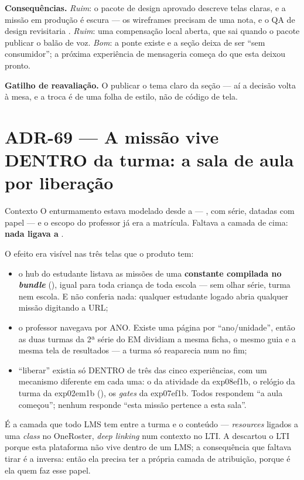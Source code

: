 \textbf{Consequências.} \emph{Ruim}: o pacote de design aprovado descreve telas
claras, e a missão em produção é escura --- os wireframes precisam de uma nota,
e o QA de design revisitaria . \emph{Ruim}: uma compensação local
aberta, que sai quando o pacote publicar o balão de voz. \emph{Bom}: a ponte
 existe e a seção deixa de ser \enquote{sem consumidor};
a próxima experiência de mensageria começa do que esta deixou pronto.

\textbf{Gatilho de reavaliação.} O  publicar o tema claro
da seção  --- aí a decisão volta à mesa, e a troca é de uma
folha de estilo, não de código de tela.

\section{ADR-69 --- A missão vive DENTRO da turma: a sala de aula por liberação}
\label{adr:sala-de-aula}

\begin{especificacao}{Contexto}
O enturmamento estava modelado desde a  --- ,
 com série,  datadas com papel --- e o escopo do
professor já era a matrícula. Faltava a camada de cima: \textbf{nada ligava
 a }.

O efeito era visível nas três telas que o produto tem:

\begin{itemize}
  \item o hub do estudante listava as missões de uma \textbf{constante compilada
    no \emph{bundle}} (), igual para
    toda criança de toda escola --- sem olhar série, turma nem escola. E
     não conferia nada: qualquer estudante logado abria
    qualquer missão digitando a URL;
  \item o professor navegava por ANO. Existe uma página por
    \enquote{ano/unidade}, então as duas turmas da 2ª série do EM dividiam a
    mesma ficha, o mesmo guia e a mesma tela de resultados --- a turma só
    reaparecia num  no fim;
  \item \enquote{liberar} existia só DENTRO de três das cinco experiências, com
    um mecanismo diferente em cada uma: o  da atividade da exp08ef1b, o
    relógio da turma da exp02em1b (), os \emph{gates} da exp07ef1b. Todos
    respondem \enquote{a aula começou}; nenhum responde \enquote{esta missão
    pertence a esta sala}.
\end{itemize}

É a camada que todo LMS tem entre a turma e o conteúdo --- \emph{resources}
ligados a uma \emph{class} no OneRoster, \emph{deep linking} num contexto no
LTI. A  descartou o LTI porque esta plataforma não vive dentro de
um LMS; a consequência que faltava tirar é a inversa: então ela precisa ter a
própria camada de atribuição, porque é ela quem faz esse papel.
\end{especificacao}


